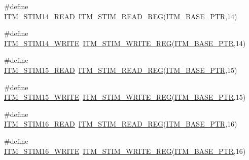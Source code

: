 \begin{DoxyCompactItemize}
\item 
\#define \hyperlink{group___i_t_m___register___accessor___macros_ga17048d30e461864d3d4ff5449fb8558f}{I\+T\+M\+\_\+\+S\+T\+I\+M14\+\_\+\+R\+E\+AD}~\hyperlink{group___i_t_m___register___accessor___macros_ga5009882336aadcd4f37b45cf3395c450}{I\+T\+M\+\_\+\+S\+T\+I\+M\+\_\+\+R\+E\+A\+D\+\_\+\+R\+EG}(\hyperlink{group___i_t_m___peripheral_gafaddee8fe8b6a898d4e5edc43ee0d703}{I\+T\+M\+\_\+\+B\+A\+S\+E\+\_\+\+P\+TR},14)
\item 
\#define \hyperlink{group___i_t_m___register___accessor___macros_ga74c1c1c1d5900b5c8553a289ddbab95b}{I\+T\+M\+\_\+\+S\+T\+I\+M14\+\_\+\+W\+R\+I\+TE}~\hyperlink{group___i_t_m___register___accessor___macros_ga049ca92a4e78e77c19af81e51aa73f1c}{I\+T\+M\+\_\+\+S\+T\+I\+M\+\_\+\+W\+R\+I\+T\+E\+\_\+\+R\+EG}(\hyperlink{group___i_t_m___peripheral_gafaddee8fe8b6a898d4e5edc43ee0d703}{I\+T\+M\+\_\+\+B\+A\+S\+E\+\_\+\+P\+TR},14)
\item 
\#define \hyperlink{group___i_t_m___register___accessor___macros_ga3ea562a68b32ba37c430e0b6d2507075}{I\+T\+M\+\_\+\+S\+T\+I\+M15\+\_\+\+R\+E\+AD}~\hyperlink{group___i_t_m___register___accessor___macros_ga5009882336aadcd4f37b45cf3395c450}{I\+T\+M\+\_\+\+S\+T\+I\+M\+\_\+\+R\+E\+A\+D\+\_\+\+R\+EG}(\hyperlink{group___i_t_m___peripheral_gafaddee8fe8b6a898d4e5edc43ee0d703}{I\+T\+M\+\_\+\+B\+A\+S\+E\+\_\+\+P\+TR},15)
\item 
\#define \hyperlink{group___i_t_m___register___accessor___macros_ga5363027769120ac7fd13164c60346eb1}{I\+T\+M\+\_\+\+S\+T\+I\+M15\+\_\+\+W\+R\+I\+TE}~\hyperlink{group___i_t_m___register___accessor___macros_ga049ca92a4e78e77c19af81e51aa73f1c}{I\+T\+M\+\_\+\+S\+T\+I\+M\+\_\+\+W\+R\+I\+T\+E\+\_\+\+R\+EG}(\hyperlink{group___i_t_m___peripheral_gafaddee8fe8b6a898d4e5edc43ee0d703}{I\+T\+M\+\_\+\+B\+A\+S\+E\+\_\+\+P\+TR},15)
\item 
\#define \hyperlink{group___i_t_m___register___accessor___macros_ga9036d1cfac0837b32666e7cb353cfd95}{I\+T\+M\+\_\+\+S\+T\+I\+M16\+\_\+\+R\+E\+AD}~\hyperlink{group___i_t_m___register___accessor___macros_ga5009882336aadcd4f37b45cf3395c450}{I\+T\+M\+\_\+\+S\+T\+I\+M\+\_\+\+R\+E\+A\+D\+\_\+\+R\+EG}(\hyperlink{group___i_t_m___peripheral_gafaddee8fe8b6a898d4e5edc43ee0d703}{I\+T\+M\+\_\+\+B\+A\+S\+E\+\_\+\+P\+TR},16)
\item 
\#define \hyperlink{group___i_t_m___register___accessor___macros_gace1ad469c70d11bf39a60780830605f3}{I\+T\+M\+\_\+\+S\+T\+I\+M16\+\_\+\+W\+R\+I\+TE}~\hyperlink{group___i_t_m___register___accessor___macros_ga049ca92a4e78e77c19af81e51aa73f1c}{I\+T\+M\+\_\+\+S\+T\+I\+M\+\_\+\+W\+R\+I\+T\+E\+\_\+\+R\+EG}(\hyperlink{group___i_t_m___peripheral_gafaddee8fe8b6a898d4e5edc43ee0d703}{I\+T\+M\+\_\+\+B\+A\+S\+E\+\_\+\+P\+TR},16)

\end{DoxyCompactItemize}
